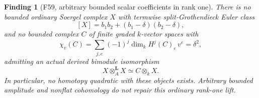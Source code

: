 \documentclass[11pt,a4paper]{article}
\newcommand{\fid}[1]{\textsf{#1}}\newcommand{\gate}[1]{\textsf{#1}}
\theoremstyle{named}\newtheorem{finding}{Finding}[section]
\theoremstyle{definition}\newtheorem{definition}[finding]{Definition}
\theoremstyle{remark}\newtheorem{remark}[finding]{Remark}
\begin{document}
\begin{finding}[\fid{F59}, arbitrary bounded scalar coefficients in rank one]
\label{f:rankOneScalarClosure}
There is no bounded ordinary Soergel complex \(X\) with
termwise split-Grothendieck Euler class
\begin{equation}\label{eq:rankOneScalarClass}
 [X]=b_1b_2+(b_1-\delta)(b_2-\delta),
\end{equation}
and no bounded complex \(C\) of finite graded \(k\)-vector
spaces with
\begin{equation}\label{eq:rankOneScalarEuler}
 \chi_v(C)=\sum_{j,e}(-1)^j\dim_kH^j(C)_e\,v^e
         =\delta^2,
\end{equation}
admitting an actual derived bimodule isomorphism
\begin{equation}\label{eq:rankOneScalarQuadratic}
 X\otimes_A^{\mathbf L}X\simeq C\otimes_kX.
\end{equation}
In particular, no homotopy quadratic with these objects
exists. Arbitrary bounded amplitude and nonflat
cohomology do not repair this ordinary rank-one lift.
\end{finding}
\end{document}
